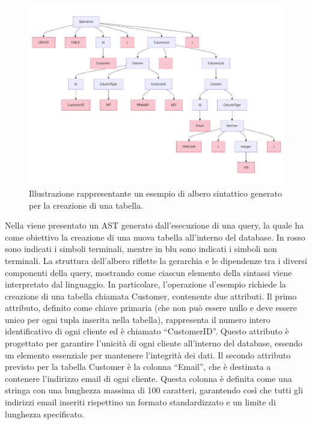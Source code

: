\documentclass[12pt,a4paper,openright,twoside]{book}
\begin{document}
\begin{figure}
\centering
\includegraphics[width=.9\linewidth]{figures/create-table-ast.pdf}
\caption{Illustrazione rappresentante un esempio di albero sintattico generato per la creazione di una tabella.}
\label{fig:create-table-ast}
\end{figure}

Nella  viene presentato un AST generato dall’esecuzione di una query, la quale ha come obiettivo la 
creazione di una nuova tabella all’interno del database. In rosso sono indicati i simboli terminali, mentre in blu sono indicati i 
simboli non terminali. La struttura dell’albero riflette la gerarchia e le dipendenze tra i diversi componenti della query, 
mostrando come ciascun elemento della sintassi viene interpretato dal linguaggio. In particolare, l’operazione d’esempio richiede 
la creazione di una tabella chiamata Customer, contenente due attributi. Il primo attributo, definito come chiave primaria (che non 
può essere nullo e deve essere unico per ogni tupla inserita nella tabella), rappresenta il numero intero identificativo di ogni 
cliente ed è chiamato ``CustomerID''. Questo attributo è progettato per garantire l’unicità di ogni cliente all’interno del database, 
essendo un elemento essenziale per mantenere l’integrità dei dati. Il secondo attributo previsto per la tabella Customer è la 
colonna ``Email'', che è destinata a contenere l’indirizzo email di ogni cliente. Questa colonna è definita come una stringa con una 
lunghezza massima di 100 caratteri, garantendo così che tutti gli indirizzi email inseriti rispettino un formato standardizzato e 
un limite di lunghezza specificato.
\end{document}

